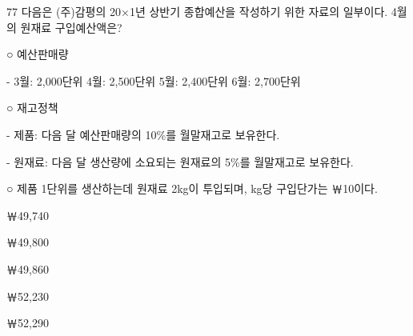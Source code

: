 \begin{question}{77}
다음은 (주)감평의 20×1년 상반기 종합예산을 작성하기 위한 자료의 일부이다. 4월의 원재료 구입예산액은?
\begin{framedtext}
○ 예산판매량 \par
- 3월: 2,000단위 \quad 4월: 2,500단위 \quad 5월: 2,400단위 \quad 6월: 2,700단위 \par
○ 재고정책 \par
- 제품: 다음 달 예산판매량의 10\%를 월말재고로 보유한다. \par
- 원재료: 다음 달 생산량에 소요되는 원재료의 5\%를 월말재고로 보유한다. \par
○ 제품 1단위를 생산하는데 원재료 2kg이 투입되며, kg당 구입단가는 ￦10이다. \par
\end{framedtext}
\begin{choices}
  \item ￦49,740
  \item ￦49,800
  \item ￦49,860
  \item ￦52,230
  \item ￦52,290
\end{choices}
\end{question}
